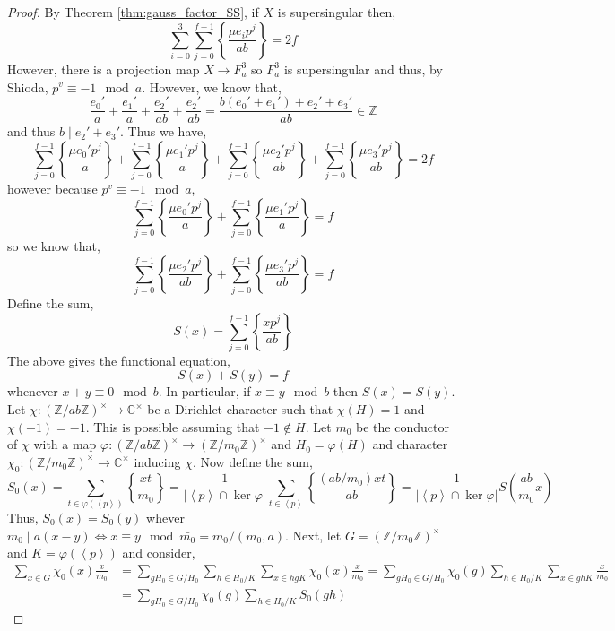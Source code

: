 \documentclass{article}
\newcommand{\Z}{\mathbb{Z}}
\newcommand{\C}{\mathbb{C}}
\newcommand{\divides}{\mid}
\theoremstyle{definition}
\theoremstyle{definition}
\theoremstyle{remark}
\begin{document}
\begin{proof}
By Theorem \ref{thm:gauss_factor_SS},  if $X$ is supersingular then,
\[ \sum_{i = 0}^3 \sum_{j = 0}^{f-1} \left\{ \frac{\mu e_i p^j}{ab} \right\} = 2f \]
However, there is a projection map $X \to F^3_{a}$ so $F^3_a$ is supersingular and thus, by Shioda, $p^v \equiv -1 \mod a$. However, we know that,
\[ \frac{e_0'}{a} + \frac{e_1'}{a} + \frac{e_2'}{ab} + \frac{e_2'}{ab} = \frac{b(e_0' + e_1') + e_2' + e_3'}{ab} \in \Z\]
and thus $b \divides e_2' + e_3'$. Thus we have,
\[  \sum_{j = 0}^{f-1} \left\{ \frac{\mu e_0' p^j}{a} \right\} + \sum_{j = 0}^{f-1} \left\{ \frac{\mu e_1' p^j}{a} \right\} +  \sum_{j = 0}^{f-1} \left\{ \frac{\mu e_2' p^j}{ab} \right\} + \sum_{j = 0}^{f-1} \left\{ \frac{\mu e_3' p^j}{ab} \right\} = 2f 
\]
however because $p^v \equiv -1 \mod a$,
\[ \sum_{j = 0}^{f-1} \left\{ \frac{\mu e_0' p^j}{a} \right\} + \sum_{j = 0}^{f-1} \left\{ \frac{\mu e_1' p^j}{a} \right\} = f \]
so we know that,
\[ \sum_{j = 0}^{f-1} \left\{ \frac{\mu e_2' p^j}{ab} \right\} + \sum_{j = 0}^{f-1} \left\{ \frac{\mu e_3' p^j}{ab} \right\} = f \]
Define the sum,
\[ S(x) = \sum_{j = 0}^{f-1} \left\{ \frac{x p^j}{ab} \right\} \]
The above gives the functional equation,
\[ S(x) + S(y) = f \]
whenever $x + y \equiv 0 \mod{b}$. In particular, if $x \equiv y \mod b$ then $S(x) = S(y)$. \bigskip\\
Let $\chi : (\Z / ab \Z)^\times \to \C^\times$ be a Dirichlet character such that $\chi(H) = 1$ and $\chi(-1) = -1$. This is possible assuming that $-1 \notin H$. Let $m_0$ be the conductor of $\chi$ with a map $\varphi : (\Z / ab \Z)^\times \to (\Z /m_0 \Z)^\times$ and $H_0 = \varphi(H)$ and character $\chi_0 : (\Z / m_0\Z)^\times \to \C^\times$ inducing $\chi$. Now define the sum,
\[ S_0(x) = \sum_{t \in \varphi(\left<p\right>)} \left\{ \frac{xt}{m_0} \right\} = \frac{1}{| \left< p \right> \cap \ker{\varphi} |} \sum_{t \in \left< p \right>} \left\{ \frac{(ab/m_0) x t}{ab} \right\} = \frac{1}{|\left< p \right> \cap \ker{\varphi}|} S\left( \frac{ab}{m_0} x \right) \]  
Thus, $S_0(x) = S_0(y)$ whever $m_0 \divides a(x - y) \iff x \equiv y \mod \bar{m_0} = m_0/(m_0,a)$. Next, let $G = (\Z / m_0 \Z)^\times$ and $K = \varphi(\left< p \right>)$ and consider,
\begin{align*} 
\sum_{x \in G} \chi_0(x) \frac{x}{m_0} & = \sum_{gH_0 \in G/H_0} \sum_{h \in H_0 / K} \sum_{x \in hg K} \chi_0(x) \frac{x}{m_0} = \sum_{gH_0 \in G/H_0} \chi_0(g)  \sum_{h \in H_0 / K} \sum_{x \in gh K} \frac{x}{m_0} 
\\
& = \sum_{gH_0 \in G/H_0} \chi_0(g)  \sum_{h \in H_0 / K} S_0(gh)

\end{align*}
\end{proof}
\end{document}
